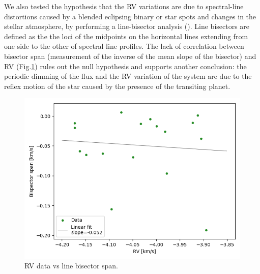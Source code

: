 \documentclass{aa}
\begin{document}
We also tested the hypothesis that the RV variations
are due to spectral-line distortions caused by a blended eclipsing binary or star spots and changes in the stellar
atmosphere, by performing a line-bisector analysis (\cite{Queloz2001}). Line bisectors are defined as the the loci of the midpoints on the horizontal lines extending from one side to the other of spectral line profiles. The lack of correlation between bisector span (measurement of the inverse of the mean slope of the bisector) and RV (Fig.\ref{fig:bisector}) rules out the null hypothesis and supports another conclusion: the periodic dimming of the flux and the RV variation of the system are due to the reflex
motion of the star caused by the presence of the transiting planet.
\begin{figure}[H]
	\centering
	\includegraphics[scale=0.45, angle=0]{pictures/bisector.png}
	\caption{RV data vs line bisector span.}
	\label{fig:bisector}
\end{figure}
\end{document}
